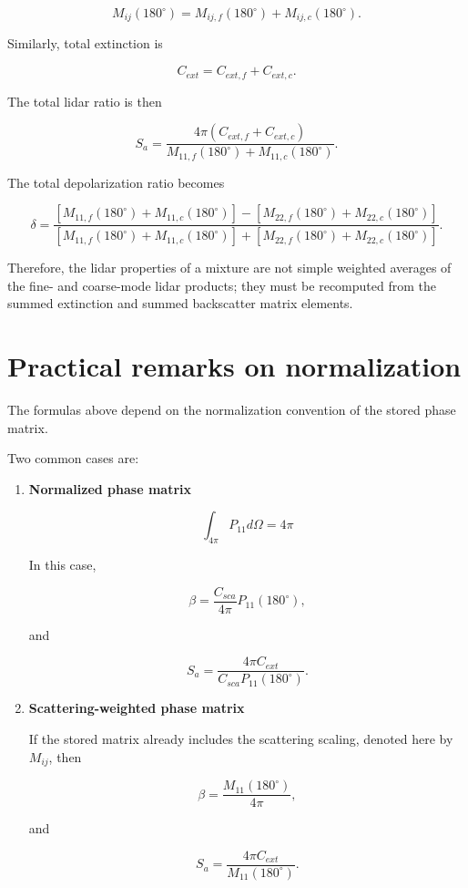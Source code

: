 \documentclass[
  letterpaper,
]{scrbook}
\begin{document}
\[
M_{ij}(180^\circ) = M_{ij,f}(180^\circ) + M_{ij,c}(180^\circ).
\]

Similarly, total extinction is

\[
C_{ext}=C_{ext,f}+C_{ext,c}.
\]

The total lidar ratio is then

\[
S_a = \frac{4\pi (C_{ext,f}+C_{ext,c})}
{M_{11,f}(180^\circ)+M_{11,c}(180^\circ)}.
\]

The total depolarization ratio becomes

\[
\delta =
\frac{\left[M_{11,f}(180^\circ)+M_{11,c}(180^\circ)\right]
-\left[M_{22,f}(180^\circ)+M_{22,c}(180^\circ)\right]}
{\left[M_{11,f}(180^\circ)+M_{11,c}(180^\circ)\right]
+\left[M_{22,f}(180^\circ)+M_{22,c}(180^\circ)\right]}.
\]

Therefore, the lidar properties of a mixture are not simple weighted
averages of the fine- and coarse-mode lidar products; they must be
recomputed from the summed extinction and summed backscatter matrix
elements.

\section{Practical remarks on
normalization}\label{practical-remarks-on-normalization}

The formulas above depend on the normalization convention of the stored
phase matrix.

Two common cases are:

\begin{enumerate}
\def\labelenumi{\arabic{enumi}.}
\item
  \textbf{Normalized phase matrix}

  \[
  \int_{4\pi} P_{11} d\Omega = 4\pi
  \]

  In this case,

  \[
  \beta=\frac{C_{sca}}{4\pi}P_{11}(180^\circ),
  \]

  and

  \[
  S_a=\frac{4\pi C_{ext}}{C_{sca}P_{11}(180^\circ)}.
  \]
\item
  \textbf{Scattering-weighted phase matrix}

  If the stored matrix already includes the scattering scaling, denoted
  here by \(M_{ij}\), then

  \[
  \beta=\frac{M_{11}(180^\circ)}{4\pi},
  \]

  and

  \[
  S_a=\frac{4\pi C_{ext}}{M_{11}(180^\circ)}.
  \]
\end{enumerate}
\end{document}

